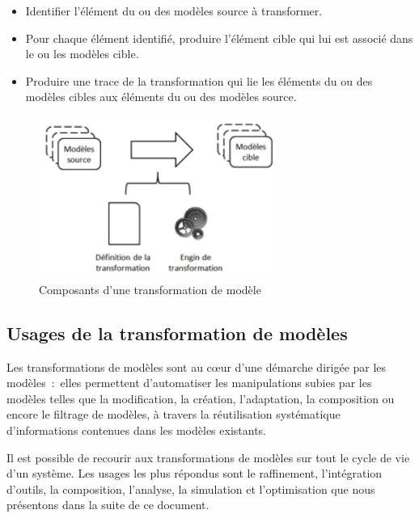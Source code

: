 \begin{itemize}
\item Identifier l'élément du ou des modèles source à transformer.
\item Pour chaque élément identifié, produire l'élément cible qui lui est 
associé dans le ou les modèles cible.
\item Produire une trace de la transformation qui lie les éléments du ou des 
modèles cibles aux éléments du ou des modèles source.
\end{itemize}

\begin{figure}[!htbp]
 \begin{center}
   \includegraphics[width=0.7\textwidth]{images/Chapitre1/composanttransfo.png}
 \end{center}
 \caption{Composants d'une transformation de modèle}
 \label{fig:composantTransfo}
\end{figure}

\subsection{Usages de la transformation de modèles }
Les transformations de modèles sont au cœur d'une démarche dirigée par les 
modèles~:~elles permettent d'automatiser les manipulations subies par les 
modèles telles que la modification, la création, l'adaptation, la composition ou 
encore le filtrage de modèles, à travers la réutilisation systématique 
d'informations contenues dans les modèles existants. 

Il est possible de recourir aux transformations de modèles sur tout le cycle de 
vie d'un système. Les usages les plus répondus sont le raffinement, 
l'intégration d'outils, la composition, l'analyse, la simulation et 
l'optimisation que nous présentons dans la suite de ce document. 

